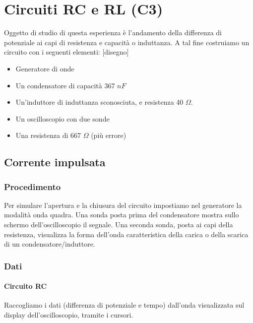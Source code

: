 \chapter{Circuiti RC e RL (C3)}

Oggetto di studio di questa esperienza è l'andamento della differenza di potenziale ai capi di resistenza e capacità o induttanza.
A tal fine costruiamo un circuito con i seguenti elementi:
[disegno]

\begin{itemize}
  \item Generatore di onde
  \item Un condensatore di capacità 367 $nF$
  \item Un'induttore di induttanza sconosciuta, e resistenza 40 $\Omega$.
  \item Un oscilloscopio con due sonde
  \item Una resistenza di 667 $\Omega$ (più errore)
\end{itemize}

\section{Corrente impulsata}
\subsection{Procedimento}


Per simulare l'apertura e la chiusura del circuito impostiamo nel generatore la modalità onda quadra. Una sonda posta prima del condensatore mostra sullo schermo dell'oscilloscopio il segnale.  
Una seconda sonda, posta ai capi della resistenza, visualizza la forma dell'onda caratteristica della carica o della scarica di un condensatore/induttore.




\subsection{Dati} 

\subsubsection{Circuito RC}

Raccogliamo i dati (differenza di potenziale e tempo) dall'onda visualizzata sul display dell'oscilloscopio, tramite i cursori. 

